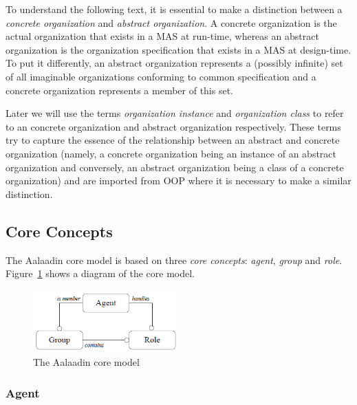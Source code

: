 To understand the following text, it is essential to make a distinction between a \textit{concrete organization} and \textit{abstract organization}.
A concrete organization is the actual organization that exists in a MAS at run-time, whereas an abstract organization is the organization specification that exists in a MAS at design-time.
To put it differently, an abstract organization represents a (possibly infinite) set of all imaginable organizations conforming to common specification and a concrete organization represents a member of this set.

Later we will use the terms \textit{organization instance} and \textit{organization class} to refer to an concrete organization and abstract organization respectively.
These terms try to capture the essence of the relationship between an abstract and concrete organization (namely, a concrete organization being an instance of an abstract organization and conversely, an abstract organization being a class of a concrete organization) and are imported from OOP where it is necessary to make a similar distinction. 

\subsection{Core Concepts}

The Aalaadin core model is based on three \textit{core concepts}: \textit{agent}, \textit{group} and \textit{role}.
Figure~\ref{figure:aalaadin-core-model} shows a diagram of the core model.

\begin{figure}[h]
	\centering
	\includegraphics[width=0.5\textwidth]{images/aalaadin-core-model.png}
	\caption{The Aalaadin core model}
	\label{figure:aalaadin-core-model}
\end{figure}

\subsubsection*{Agent}

